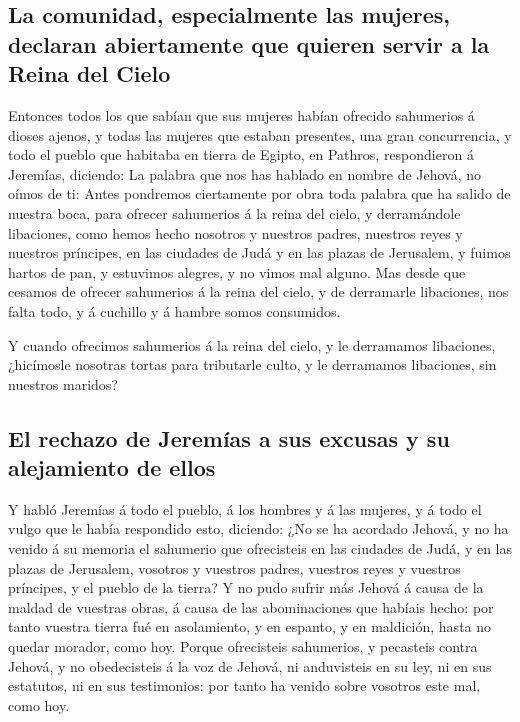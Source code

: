 \hypertarget{la-comunidad-especialmente-las-mujeres-declaran-abiertamente-que-quieren-servir-a-la-reina-del-cielo}{%
\subsection{La comunidad, especialmente las mujeres, declaran
abiertamente que quieren servir a la Reina del
Cielo}\label{la-comunidad-especialmente-las-mujeres-declaran-abiertamente-que-quieren-servir-a-la-reina-del-cielo}}

 Entonces todos los que sabían que sus mujeres habían
ofrecido sahumerios á dioses ajenos, y todas las mujeres que estaban
presentes, una gran concurrencia, y todo el pueblo que habitaba en
tierra de Egipto, en Pathros, respondieron á Jeremías, diciendo:
 La palabra que nos has hablado en nombre de Jehová, no
oímos de ti:  Antes pondremos ciertamente por obra toda
palabra que ha salido de nuestra boca, para ofrecer sahumerios á la
reina del cielo, y derramándole libaciones, como hemos hecho nosotros y
nuestros padres, nuestros reyes y nuestros príncipes, en las ciudades de
Judá y en las plazas de Jerusalem, y fuimos hartos de pan, y estuvimos
alegres, y no vimos mal alguno.  Mas desde que cesamos de
ofrecer sahumerios á la reina del cielo, y de derramarle libaciones, nos
falta todo, y á cuchillo y á hambre somos consumidos.

 Y cuando ofrecimos sahumerios á la reina del cielo, y le
derramamos libaciones, ¿hicímosle nosotras tortas para tributarle culto,
y le derramamos libaciones, sin nuestros maridos?

\hypertarget{el-rechazo-de-jeremuxedas-a-sus-excusas-y-su-alejamiento-de-ellos}{%
\subsection{El rechazo de Jeremías a sus excusas y su alejamiento de
ellos}\label{el-rechazo-de-jeremuxedas-a-sus-excusas-y-su-alejamiento-de-ellos}}

 Y habló Jeremías á todo el pueblo, á los hombres y á las
mujeres, y á todo el vulgo que le había respondido esto, diciendo:
 ¿No se ha acordado Jehová, y no ha venido á su memoria el
sahumerio que ofrecisteis en las ciudades de Judá, y en las plazas de
Jerusalem, vosotros y vuestros padres, vuestros reyes y vuestros
príncipes, y el pueblo de la tierra?  Y no pudo sufrir más
Jehová á causa de la maldad de vuestras obras, á causa de las
abominaciones que habíais hecho: por tanto vuestra tierra fué en
asolamiento, y en espanto, y en maldición, hasta no quedar morador, como
hoy.  Porque ofrecisteis sahumerios, y pecasteis contra
Jehová, y no obedecisteis á la voz de Jehová, ni anduvisteis en su ley,
ni en sus estatutos, ni en sus testimonios: por tanto ha venido sobre
vosotros este mal, como hoy.

